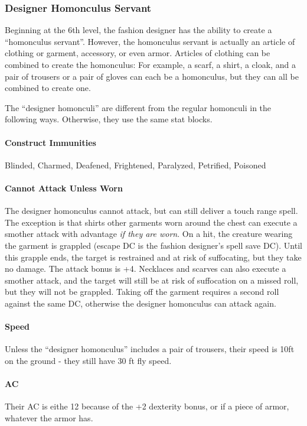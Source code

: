 \documentclass[twocolumn]{dndbook}
\begin{document}
\subsubsection{Designer Homonculus Servant}
Beginning at the 6th level, the fashion designer has the ability to create a ``homonculus servant''.
However, the homonculus servant is actually an article of clothing or garment, accessory, or even armor.
Articles of clothing can be combined to create the homonculus:
For example, a scarf, a shirt, a cloak, and a pair of trousers or a pair of gloves can each be a homonculus,
but they can all be combined to create one.

The ``designer homonculi'' are different from the regular homonculi in the following ways.
Otherwise, they use the same stat blocks.

\paragraph{Construct Immunities} Blinded, Charmed, Deafened, Frightened, Paralyzed, Petrified, Poisoned

\paragraph{Cannot Attack Unless Worn}
The designer homonculus cannot attack, but can still deliver a touch range spell.
The exception is that shirts other garments worn around the chest can execute a smother attack with advantage \emph{if they are worn}.
On a hit, the creature wearing the garment is grappled (escape DC is the fashion designer's spell save DC).
Until this grapple ends, the target is restrained and at risk of suffocating, but they take no damage.
The attack bonus is +4.
Necklaces and scarves can also execute a smother attack, and the target will still be at risk of suffocation on a missed roll, but they will not be grappled.
Taking off the garment requires a second roll against the same DC, otherwise the designer homonculus can attack again.

\paragraph{Speed}
Unless the ``designer homonculus'' includes a pair of trousers, their speed is 10ft on the ground - they still have 30 ft fly speed.

\paragraph{AC}
Their AC is eithe 12 because of the +2 dexterity bonus, or if a piece of armor, whatever the armor has.
\end{document}
